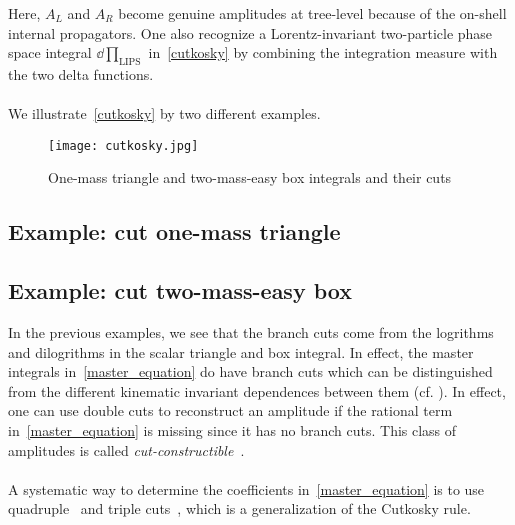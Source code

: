 Here, $A_L$ and $A_R$ become genuine amplitudes at tree-level because of the on-shell internal propagators. 
One also recognize a Lorentz-invariant two-particle phase space integral $\dd\prod_{\mathrm{LIPS}}$ in~\cref{cutkosky} by combining the integration measure with the two delta functions.
\\\\
We illustrate~\cref{cutkosky} by two different examples.
%
%
\begin{figure}[h]
  \centering
  \texttt{[image: cutkosky.jpg]}
  \caption{One-mass triangle and two-mass-easy box integrals and their cuts}
  \label{fig-cutkosky}
\end{figure}
\subsection{Example: cut one-mass triangle}

\subsection{Example: cut two-mass-easy box}


%
In the previous examples, we see that the branch cuts come from the logrithms and dilogrithms in the scalar triangle and box integral. 
In effect, the master integrals in~\cref{master_equation} do have branch cuts which can be distinguished from the different kinematic invariant dependences between them (cf. \eg \cite{Bern:1993kr}).
In effect, one can use double cuts to reconstruct an amplitude if the rational term in~\cref{master_equation} is missing since it has no branch cuts.
This class of amplitudes is called \textit{cut-constructible}~\cite{Bern:1994cg}. 
\\\\
A systematic way to determine the coefficients in~\cref{master_equation} is to use quadruple~\cite{BRITTO2005499} and triple cuts~\cite{Forde:2007mi}, which is a generalization of the Cutkosky rule.